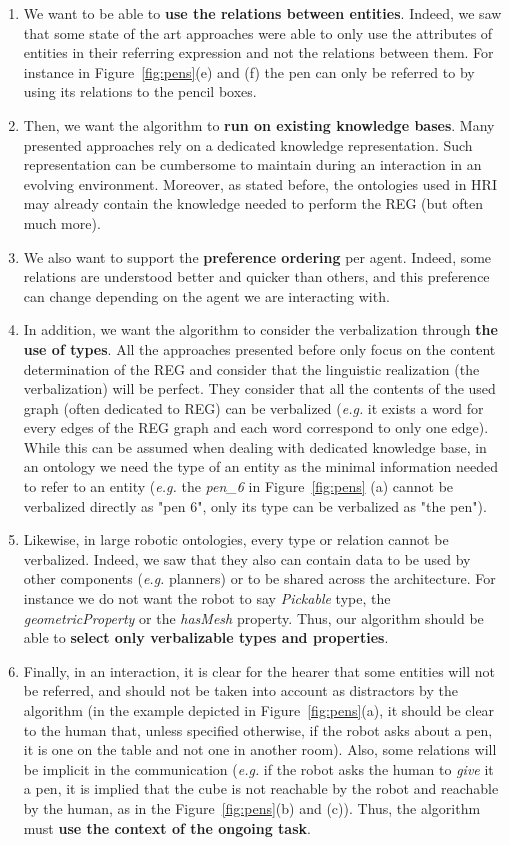 \documentclass[a4paper,11pt,twoside]{StyleThese}
\begin{document}
\begin{enumerate}


\item We want to be able to \textbf{use the relations between entities}. Indeed, we saw that some state of the art approaches were able to only use the attributes of entities in their referring expression and not the relations between them. For instance in Figure~\ref{fig:pens}(e) and (f) the pen can only be referred to by using its relations to the pencil boxes. 
\item Then, we want the algorithm to \textbf{run on existing knowledge bases}. Many presented approaches rely on a dedicated knowledge representation. Such representation can be cumbersome to maintain during an interaction in an evolving environment. Moreover, as stated before, the ontologies used in HRI may already contain the knowledge needed to perform the REG (but often much more). 
\item We also want to support the \textbf{preference ordering} per agent. Indeed, some relations are understood better and quicker than others, and this preference can change depending on the agent we are interacting with. 
\item In addition, we want the algorithm to consider the verbalization through \textbf{the use of types}. All the approaches presented before only focus on the content determination of the REG and consider that the linguistic realization (the verbalization) will be perfect. They consider that all the contents of the used graph (often dedicated to REG) can be verbalized (\textit{e.g.} it exists a word for every edges of the REG graph and each word correspond to only one edge). While this can be assumed when dealing with dedicated knowledge base, in an ontology we need the type of an entity as the minimal information needed to refer to an entity (\textit{e.g.} the \textit{pen\_6} in Figure~\ref{fig:pens} (a) cannot be verbalized directly as "pen 6", only its type can be verbalized as "the pen").
\item Likewise, in large robotic ontologies, every type or relation cannot be verbalized. Indeed, we saw that they also can contain data to be used by other components (\textit{e.g.} planners) or to be shared across the architecture. For instance we do not want the robot to say \textit{Pickable} type, the \textit{geometricProperty} or the \textit{hasMesh} property. Thus, our algorithm should be able to \textbf{select only verbalizable types and properties}.
\item Finally, in an interaction, it is clear for the hearer that some entities will not be referred, and should not be taken into account as distractors by the algorithm (in the example depicted in Figure~\ref{fig:pens}(a), it should be clear to the human that, unless specified otherwise, if the robot asks about a pen, it is one on the table and not one in another room). Also, some relations will be implicit in the communication (\textit{e.g.} if the robot asks the human to \textit{give} it a pen, it is implied that the cube is not reachable by the robot and reachable by the human, as in the Figure~\ref{fig:pens}(b) and (c)). Thus, the algorithm must \textbf{use the context of the ongoing task}. 


\end{enumerate}
\end{document}
